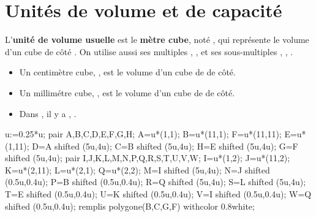 \section{Unités de volume et de capacité}
\begin{definition}
    L'{\bf unité de volume usuelle} est le {\bf mètre cube}, noté \Vol[m]{}, qui représente le volume d'un cube de côté .
    On utilise aussi ses multiples \Vol[km]{}, \Vol[hm]{}, \Vol[dam]{} et ses sous-multiples \Vol[dm]{}, \Vol[cm]{}, \Vol[mm]{}.
\end{definition}

\begin{remarque}

    \begin{minipage}{0.6\linewidth}
        \begin{itemize}
            \item Un centimètre cube, , est le volume d'un cube de  de côté.
            \item Un millimétre cube, , est le volume d'un cube de  de côté.\medskip
            \item Dans , il y a , .
        \end{itemize}
    \end{minipage}
    \begin{minipage}{0.4\linewidth}
        \begin{center}
            \begin{Geometrie}[CoinBG={(-0.5u,-0.5u)}]
                u:=0.25*u;
                pair A,B,C,D,E,F,G,H;
                A=u*(1,1);
                B=u*(11,1);
                F=u*(11,11);
                E=u*(1,11);
                D=A shifted (5u,4u);
                C=B shifted (5u,4u);
                H=E shifted (5u,4u);
                G=F shifted (5u,4u);
                pair I,J,K,L,M,N,P,Q,R,S,T,U,V,W;
                I=u*(1,2);
                J=u*(11,2);
                K=u*(2,11);
                L=u*(2,1);
                Q=u*(2,2);
                M=I shifted (5u,4u);
                N=J shifted (0.5u,0.4u);
                P=B shifted (0.5u,0.4u);
                R=Q shifted (5u,4u);
                S=L shifted (5u,4u);
                T=E shifted (0.5u,0.4u);
                U=K shifted (0.5u,0.4u);
                V=I shifted (0.5u,0.4u);
                W=Q shifted (0.5u,0.4u);
                remplis polygone(B,C,G,F) withcolor 0.8white;

\end{Geometrie}
\end{center}
\end{minipage}
\end{remarque}
